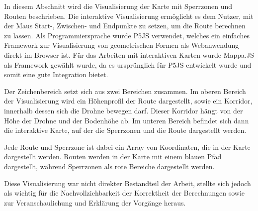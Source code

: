In diesem Abschnitt wird die Visualisierung der Karte mit Sperrzonen und Routen beschrieben. Die interaktive Visualisierung ermöglicht es dem Nutzer, mit der Maus Start-, Zwischen- und Endpunkte zu setzen, um die Route berechnen zu lassen. Als Programmiersprache wurde P5JS verwendet, welches ein einfaches Framework zur Visualisierung von geometrischen Formen als Webanwendung direkt im Browser ist. Für das Arbeiten mit interaktiven Karten wurde Mappa.JS als Framework gewählt wurde, da es ursprünglich für P5JS entwickelt wurde und somit eine gute Integration bietet.

Der Zeichenbereich setzt sich aus zwei Bereichen zusammen.
Im oberen Bereich der Visualisierung wird ein Höhenprofil der Route dargestellt, sowie ein Korridor, innerhalb dessen sich die Drohne bewegen darf. Dieser Korridor hängt von der Höhe der Drohne und der Bodenhöhe ab.
Im unteren Bereich befindet sich dann die interaktive Karte, auf der die Sperrzonen und die Route dargestellt werden.

Jede Route und Sperrzone ist dabei ein Array von Koordinaten, die in der Karte dargestellt werden. Routen werden in der Karte mit einem blauen Pfad dargestellt, während Sperrzonen als rote Bereiche dargestellt werden.

Diese Visualisierung war nicht direkter Bestandteil der Arbeit,  stellte sich jedoch als wichtig für die Nachvollziehbarkeit der Korrektheit der Berechnungen sowie zur Veranschaulichung und Erklärung der Vorgänge heraus.